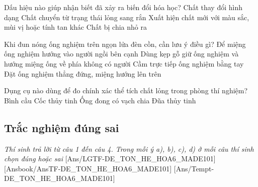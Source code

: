 \documentclass[FileMain.tex]{subfiles}
\begin{document}
\begin{ex}%
Dấu hiệu nào giúp nhận biết đã xảy ra biến đổi hóa học?
\choice
{Chất thay đổi hình dạng}
{Chất chuyển từ trạng thái lỏng sang rắn}
{\True Xuất hiện chất mới với màu sắc, mùi vị hoặc tính tan khác}
{Chất bị chia nhỏ ra}
\end{ex}

\begin{ex}%
Khi đun nóng ống nghiệm trên ngọn lửa đèn cồn, cần lưu ý điều gì?
\choice
{Để miệng ống nghiệm hướng vào người ngồi bên cạnh}
{\True Dùng kẹp gỗ giữ ống nghiệm và hướng miệng ống về phía không có người}
{Cầm trực tiếp ống nghiệm bằng tay}
{Đặt ống nghiệm thẳng đứng, miệng hướng lên trên}
\end{ex}

\begin{ex}%
Dụng cụ nào dùng để đo chính xác thể tích chất lỏng trong phòng thí nghiệm?
\choice
{Bình cầu}
{Cốc thủy tinh}
{\True Ống đong có vạch chia}
{Đũa thủy tinh}
\end{ex}


\subsection{Trắc nghiệm đúng sai}\textit{\large Thí sinh trả lời từ câu 1 đến câu 4. Trong mỗi ý a), b), c), d) ở mỗi câu thí sinh chọn đúng hoặc sai}
[Ans/LGTF-DE_TON_HE_HOA6_MADE101]
[Ansbook/AnsTF-DE_TON_HE_HOA6_MADE101]
[Ans/Tempt-DE_TON_HE_HOA6_MADE101]
\setcounter{ex}{0}
\end{document}
